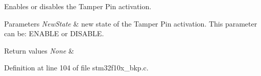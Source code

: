 Enables or disables the Tamper Pin activation. 


\begin{DoxyParams}{Parameters}
{\em New\+State} & new state of the Tamper Pin activation. This parameter can be\+: E\+N\+A\+B\+LE or D\+I\+S\+A\+B\+LE. \\
\hline
\end{DoxyParams}

\begin{DoxyRetVals}{Return values}
{\em None} & \\
\hline
\end{DoxyRetVals}


Definition at line 104 of file stm32f10x\+\_\+bkp.\+c.

